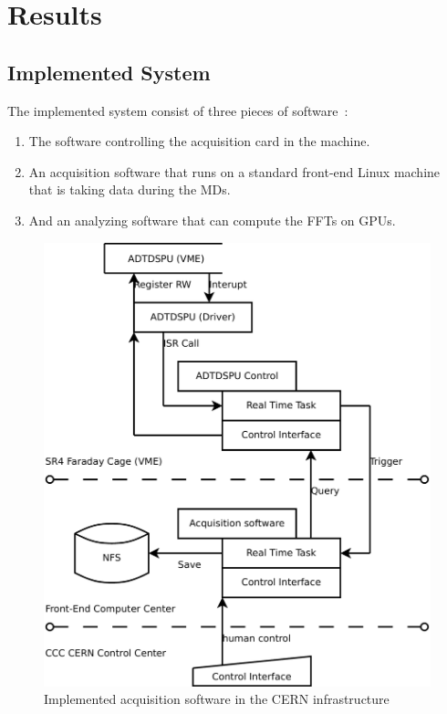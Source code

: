%

\chapter{Results}

\section{Implemented System}

The implemented system consist of three pieces of software~:
\begin{enumerate}
\item The software controlling the acquisition card in the machine.
\item An acquisition software that runs on a standard front-end Linux machine that is taking data during the \glspl{MD}.
\item And an analyzing software that can compute the \glspl{FFT} on \glspl{GPU}.
\end{enumerate}

\begin{figure}[H]
\caption{Implemented acquisition software in the CERN infrastructure}
\centering
\includegraphics[scale=0.3]{ImplementedSoftFesa.pdf}
\end{figure}

